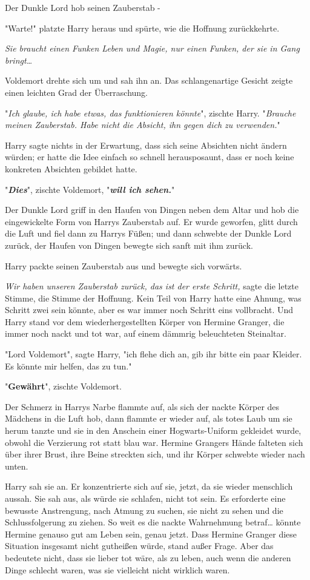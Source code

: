 {Der Dunkle Lord hob seinen Zauberstab -

"Warte!" platzte Harry heraus und spürte, wie die Hoffnung zurückkehrte.

\emph{Sie braucht einen Funken Leben und Magie, nur einen Funken, der sie in Gang bringt…}

Voldemort drehte sich um und sah ihn an. Das schlangenartige Gesicht zeigte einen leichten Grad der Überraschung.

"\emph{Ich glaube, ich habe etwas, das funktionieren könnte}", zischte Harry. "\emph{Brauche meinen Zauberstab. Habe nicht die Absicht, ihn gegen dich zu verwenden.}"

Harry sagte nichts in der Erwartung, dass sich seine Absichten nicht ändern würden; er hatte die Idee einfach so schnell herausposaunt, dass er noch keine konkreten Absichten gebildet hatte.

"\textbf{\emph{Dies}}", zischte Voldemort, "\textbf{\emph{will ich sehen.}}"

Der Dunkle Lord griff in den Haufen von Dingen neben dem Altar und hob die eingewickelte Form von Harrys Zauberstab auf. Er wurde geworfen, glitt durch die Luft und fiel dann zu Harrys Füßen; und dann schwebte der Dunkle Lord zurück, der Haufen von Dingen bewegte sich sanft mit ihm zurück.

Harry packte seinen Zauberstab aus und bewegte sich vorwärts.

\emph{Wir haben unseren Zauberstab zurück, das ist der erste Schritt,} sagte die letzte Stimme, die Stimme der Hoffnung. Kein Teil von Harry hatte eine Ahnung, was Schritt zwei sein könnte, aber es war immer noch Schritt eins vollbracht. Und Harry stand vor dem wiederhergestellten Körper von Hermine Granger, die immer noch nackt und tot war, auf einem dämmrig beleuchteten Steinaltar.

"Lord Voldemort", sagte Harry, "ich flehe dich an, gib ihr bitte ein paar Kleider. Es könnte mir helfen, das zu tun."

"\textbf{Gewährt}", zischte Voldemort.

Der Schmerz in Harrys Narbe flammte auf, als sich der nackte Körper des Mädchens in die Luft hob, dann flammte er wieder auf, als totes Laub um sie herum tanzte und sie in den Anschein einer Hogwarts-Uniform gekleidet wurde, obwohl die Verzierung rot statt blau war. Hermine Grangers Hände falteten sich über ihrer Brust, ihre Beine streckten sich, und ihr Körper schwebte wieder nach unten.

Harry sah sie an. Er konzentrierte sich auf sie, jetzt, da sie wieder menschlich aussah. Sie sah aus, als würde sie schlafen, nicht tot sein. Es erforderte eine bewusste Anstrengung, nach Atmung zu suchen, sie nicht zu sehen und die Schlussfolgerung zu ziehen. So weit es die nackte Wahrnehmung betraf… könnte Hermine genauso gut am Leben sein, genau jetzt. Dass Hermine Granger diese Situation insgesamt nicht gutheißen würde, stand außer Frage. Aber das bedeutete nicht, dass sie lieber tot wäre, als zu leben, auch wenn die anderen Dinge schlecht waren, was sie vielleicht nicht wirklich waren.

}
